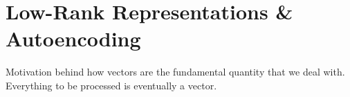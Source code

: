 \chapter{Low-Rank Representations \& Autoencoding}

Motivation behind how vectors are the fundamental quantity that we deal with. Everything to be processed is eventually a vector. 










